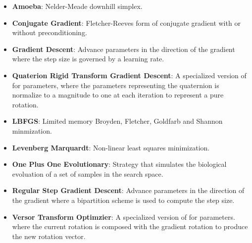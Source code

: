 \begin{itemize}

\item \textbf{Amoeba}: Nelder-Meade downhill simplex.

\item \textbf{Conjugate Gradient}: Fletcher-Reeves form 
of conjugate gradient with or without preconditioning.

\item \textbf{Gradient Descent}: Advance parameters in the direction of the
gradient where the step size is governed by a learning rate. 

\item \textbf{Quaterion Rigid Transform Gradient Descent}: 
A specialized version of  for
 parameters, where the parameters
representing the quaternion is normalize to a magnitude to one at each
iteration to represent a pure rotation.

\item \textbf{LBFGS}: Limited memory Broyden, Fletcher, Goldfarb
and Shannon minmization.

\item \textbf{Levenberg Marquardt}: Non-linear least squares minimization.

\item \textbf{One Plus One Evolutionary}: Strategy that simulates the 
biological evoluation of a set of samples in the search space.

\item \textbf{Regular Step Gradient Descent}: Advance parameters in the
direction of the gradient where a bipartition scheme is used to compute
the step size. 

\item \textbf{Versor Transform Optimzier}:
A specialized version of 
for  parameters.
where the current rotation is composed with the gradient rotation
to produce the new rotation vector.

\end{itemize}



